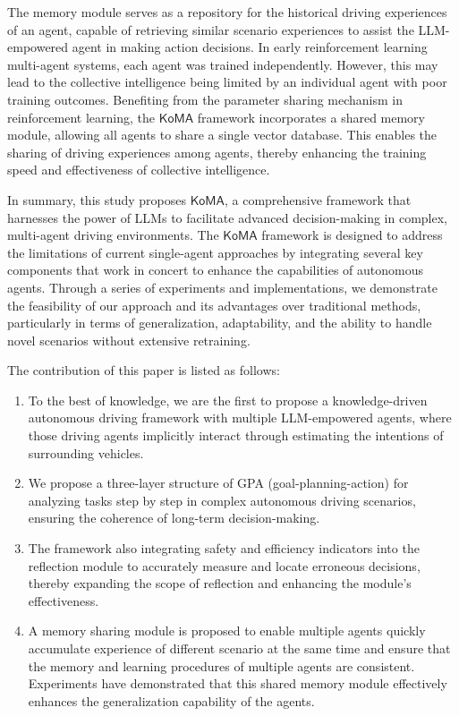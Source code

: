\documentclass[lettersize,journal]{IEEEtran}
\begin{document}
The memory module serves as a repository for the historical driving experiences of an agent, capable of retrieving similar scenario experiences to assist the LLM-empowered agent in making action decisions. In early reinforcement learning multi-agent systems, each agent was trained independently\cite{tampuu2017multiagent}. However, this may lead to the collective intelligence being limited by an individual agent with poor training outcomes. Benefiting from the parameter sharing mechanism in reinforcement learning\cite{gupta2017cooperative}, the $\mathsf{KoMA}$ framework incorporates a shared memory module, allowing all agents to share a single vector database. This enables the sharing of driving experiences among agents, thereby enhancing the training speed and effectiveness of collective intelligence.

In summary, this study proposes $\mathsf{KoMA}$, a comprehensive framework that harnesses the power of LLMs to facilitate advanced decision-making in complex, multi-agent driving environments. The $\mathsf{KoMA}$ framework is designed to address the limitations of current single-agent approaches by integrating several key components that work in concert to enhance the capabilities of autonomous agents. Through a series of experiments and implementations, we demonstrate the feasibility of our approach and its advantages over traditional methods, particularly in terms of generalization, adaptability, and the ability to handle novel scenarios without extensive retraining.

The contribution of this paper is listed as follows:
\begin{enumerate}
    \item To the best of knowledge, we are the first to propose a knowledge-driven autonomous driving framework with multiple LLM-empowered agents, where those driving agents implicitly interact through estimating the intentions of surrounding vehicles. 
    \item We propose a three-layer structure of GPA (goal-planning-action) for analyzing tasks step by step in complex autonomous driving scenarios, ensuring the coherence of long-term decision-making. 
    \item The framework also integrating safety and efficiency indicators into the reflection module to accurately measure and locate erroneous decisions, thereby expanding the scope of reflection and enhancing the module's effectiveness.
    \item A memory sharing module is proposed to enable multiple agents quickly accumulate experience of different scenario at the same time and ensure that the memory and learning procedures of multiple agents are consistent. Experiments have demonstrated that this shared memory module effectively enhances the generalization capability of the agents.
\end{enumerate}
\end{document}
